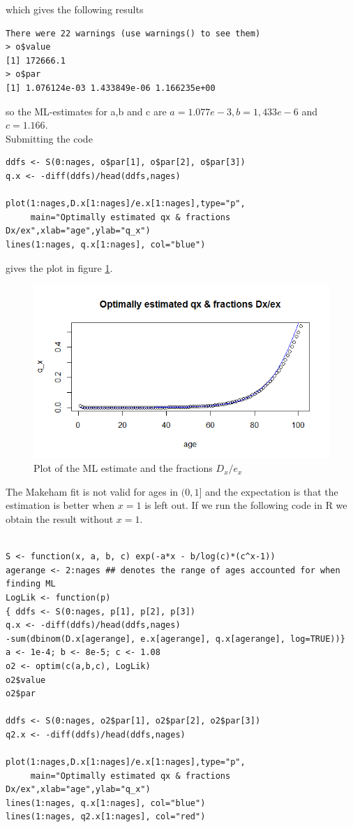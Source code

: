 which gives the following results

\begin{verbatim}
There were 22 warnings (use warnings() to see them)
> o$value
[1] 172666.1
> o$par
[1] 1.076124e-03 1.433849e-06 1.166235e+00
\end{verbatim}
so the ML-estimates for a,b and c are $a = 1.077e-3, b=1,433e-6$ and $c = 1.166$. \\
Submitting the code
\begin{verbatim}
ddfs <- S(0:nages, o$par[1], o$par[2], o$par[3])
q.x <- -diff(ddfs)/head(ddfs,nages)

plot(1:nages,D.x[1:nages]/e.x[1:nages],type="p",
     main="Optimally estimated qx & fractions Dx/ex",xlab="age",ylab="q_x")
lines(1:nages, q.x[1:nages], col="blue")
\end{verbatim}
gives the plot in figure \ref{Figure_Question9_1}.
\begin{center}
\begin{figure}

\includegraphics[scale=1]{Question_9_MakehamGompertz_1.png}

\caption{Plot of the ML estimate and the fractions $D_x/e_x$}
\label{Figure_Question9_1}

\end{figure}
\end{center}

The Makeham fit is not valid for ages in $(0,1]$ and the expectation is that the estimation is better when $x=1$ is left out. If we run the following code in R we obtain the result without $x=1$.
\begin{verbatim}

S <- function(x, a, b, c) exp(-a*x - b/log(c)*(c^x-1))
agerange <- 2:nages ## denotes the range of ages accounted for when finding ML
LogLik <- function(p)
{ ddfs <- S(0:nages, p[1], p[2], p[3])
q.x <- -diff(ddfs)/head(ddfs,nages)
-sum(dbinom(D.x[agerange], e.x[agerange], q.x[agerange], log=TRUE))}
a <- 1e-4; b <- 8e-5; c <- 1.08
o2 <- optim(c(a,b,c), LogLik) 
o2$value
o2$par

ddfs <- S(0:nages, o2$par[1], o2$par[2], o2$par[3])
q2.x <- -diff(ddfs)/head(ddfs,nages)

plot(1:nages,D.x[1:nages]/e.x[1:nages],type="p",
     main="Optimally estimated qx & fractions Dx/ex",xlab="age",ylab="q_x")
lines(1:nages, q.x[1:nages], col="blue")
lines(1:nages, q2.x[1:nages], col="red")

\end{verbatim}

